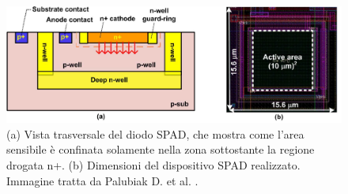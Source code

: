 \begin{figure}[b]
	\centering
	\includegraphics[width=0.8\linewidth]{./ImageFiles/cmos_2.jpg}
	\caption{(a) Vista trasversale del diodo SPAD, che mostra come l'area sensibile è confinata solamente nella zona sottostante la regione drogata n+. (b) Dimensioni del dispositivo SPAD realizzato. Immagine tratta da Palubiak D. et al. \cite{Palubiak2011}.} 
	\label{fig:cmos_2}
\end{figure} 

